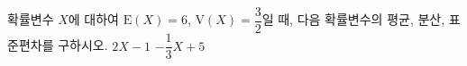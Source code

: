 확률변수 $X$에 대하여 $\mathrm{E}(X)=6$, $\mathrm{V}(X)=\dfrac{3}{2}$일 때, 다음 확률변수의 평균, 분산, 표준편차를 구하시오.
 $2X-1$
 $-\dfrac{1}{3}X+5$
